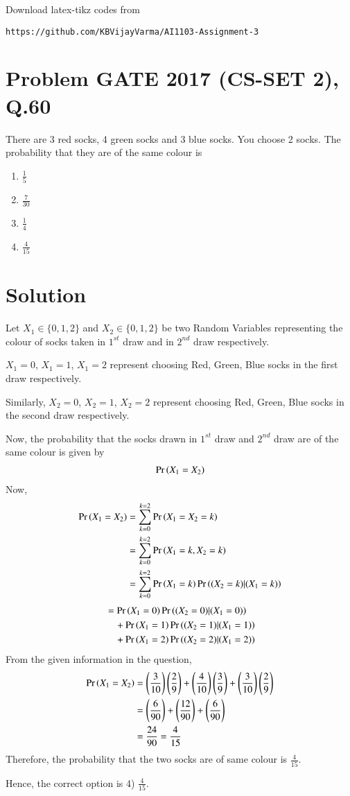\documentclass[journal,12pt,twocolumn]{IEEEtran}
\begin{document}
%
Download latex-tikz codes from 
%
\begin{lstlisting}
https://github.com/KBVijayVarma/AI1103-Assignment-3
\end{lstlisting}
\section*{\textbf{Problem GATE 2017 (CS-SET 2), Q.60}}
There are 3 red socks, 4 green socks and 3 blue socks. You choose 2 socks. The probability that they are of the same colour is 
\begin{multicols}{4}
\begin{enumerate}
    \item $\frac{1}{5}$
    \item $\frac{7}{30}$
    \item $\frac{1}{4}$ 
    \item $\frac{4}{15}$ 
\end{enumerate}
\end{multicols}
\section*{\textbf{Solution}}
Let $X_1 \in \{0,1,2\}$ and $X_2 \in \{0,1,2\}$ be two Random Variables representing the colour of socks taken in $1^{st}$ draw and in $2^{nd}$ draw respectively.

$X_1 = 0$, $X_1 = 1$, $X_1 = 2$ represent choosing Red, Green, Blue socks in the first draw respectively.

Similarly, $X_2 = 0$, $X_2 = 1$, $X_2 = 2$ represent choosing Red, Green, Blue socks in the second draw respectively.

Now, the probability that the socks drawn in $1^{st}$ draw and $2^{nd}$ draw are of the same colour is given by
\begin{align*}
\Pr\left(X_1 = X_2\right)    
\end{align*}
Now,
\begin{align}
\Pr\left(X_1 = X_2\right) &= \sum_{k = 0}^{k = 2} \Pr\left(X_1 = X_2 = k\right) \\
&= \sum_{k = 0}^{k = 2} \Pr\left(X_1 = k, X_2 = k\right) \\
&= \sum_{k = 0}^{k = 2} \Pr\left(X_1 = k\right) \Pr\left((X_2 = k) | (X_1 = k)\right)
\end{align}
\begin{align}
&= \Pr\left(X_1 = 0\right) \Pr\left((X_2 = 0) | (X_1 = 0)\right) \\ \nonumber
& \quad + \Pr\left(X_1 = 1\right) \Pr\left((X_2 = 1) | (X_1 = 1)\right) \\ \nonumber
& \quad + \Pr\left(X_1 = 2\right) \Pr\left((X_2 = 2) | (X_1 = 2)\right)
\end{align}
From the given information in the question,
\begin{align}
\Pr\left(X_1 = X_2\right) &= \left(\frac{3}{10} \right) \left(\frac{2}{9} \right) + \left(\frac{4}{10} \right) \left(\frac{3}{9} \right) + \left(\frac{3}{10} \right) \left(\frac{2}{9} \right) \\
&= \left(\frac{6}{90} \right) + \left(\frac{12}{90} \right) + \left(\frac{6}{90} \right) \\
&= \frac{24}{90} = \frac{4}{15}
\end{align}
Therefore, the probability that the two socks are of same colour is $\frac{4}{15}$.

Hence, the correct option is 4) $\frac{4}{15}$.
\end{document}
